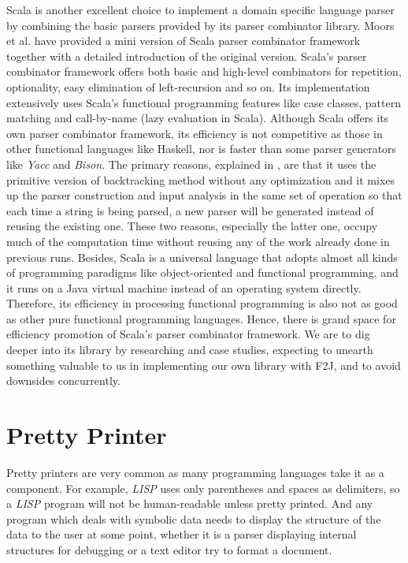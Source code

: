 Scala is another excellent choice to implement a domain specific language parser by combining the basic parsers provided by its parser combinator library. Moors et al. \cite{Moors:2008} have provided a mini version of Scala parser combinator framework together with a detailed introduction of the original version. Scala's parser combinator framework offers both basic and high-level combinators for repetition, optionality, easy elimination of left-recursion and so on. Its implementation extensively uses Scala's functional programming features like case classes, pattern matching and call-by-name (lazy evaluation in Scala). Although Scala offers its own parser combinator framework, its efficiency is not competitive as those in other functional languages like Haskell, nor is faster than some parser generators like \textit{Yacc} and \textit{Bison}. The primary reasons, explained in \cite{Scala:2008}, are that it uses the primitive version of backtracking method without any optimization and it mixes up the parser construction and input analysis in the same set of operation so that each time a string is being parsed, a new parser will be generated instead of reusing the existing one. These two reasons, especially the latter one, occupy much of the computation time without reusing any of the work already done in previous runs. Besides, Scala is a universal language that adopts almost all kinds of programming paradigms like object-oriented and functional programming, and it runs on a Java virtual machine instead of an operating system directly. Therefore, its efficiency in processing functional programming is also not as good as other pure functional programming languages. Hence, there is grand space for efficiency promotion of Scala's parser combinator framework. We are to dig deeper into its library by researching and case studies, expecting to unearth something valuable to us in implementing our own library with F2J, and to avoid downsides concurrently.

\section{Pretty Printer}

Pretty printers are very common as many programming languages take it as a component. For example, \textit{LISP} uses only parentheses and spaces as delimiters, so a \textit{LISP} program will not be human-readable unless pretty printed. And any program which deals with symbolic data needs to display the structure of the data to the user at some point, whether it is a parser displaying internal structures for debugging or a text editor try to format a document.

